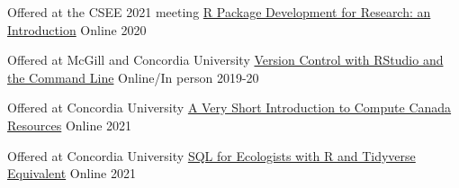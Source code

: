 \vspace{5pt}
\vspace{3pt}


\begin{cventries}

  \cventry
    {Offered at the CSEE 2021 meeting} %
    {\href{https://github.com/VLucet/R_pkg_dev_for_research_CSEE_2021}{R Package Development for Research: an Introduction}} %
    {Online} %
    {2020} %
    {}

  \vspace{-8pt}
  \cventry
    {Offered at McGill and Concordia University} %
    {\href{https://github.com/VLucet/git-and-github-with-r-workshop}{Version Control with RStudio and the Command Line}} %
    {Online/In person} %
    {2019-20} %
    {}

  \vspace{-8pt}
  \cventry
    {Offered at Concordia University} %
    {\href{https://github.com/VLucet/ComputeCanada-short-intro}{A Very Short Introduction to Compute Canada Resources}} %
    {Online} %
    {2021} %
    {}  

  \vspace{-8pt}
  \cventry
    {Offered at Concordia University} %
    {\href{https://github.com/VLucet/sql-workshop-for-ecologists}{SQL for Ecologists with R and Tidyverse Equivalent}} %
    {Online} %
    {2021} %
    {}

\end{cventries}

\vspace{-12pt}

